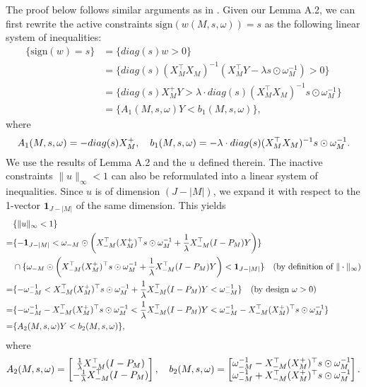 \documentclass[11pt]{article}
\newcommand{\q}{\text{\quad}}
\newcommand{\sgn}{\textrm{sign}}
\begin{document}
	The proof below follows similar arguments as in \cite{tian2018selective}. Given our Lemma A.2, we can first rewrite the active constraints $\sgn(w(M,s,\omega))=s$ as the following linear system of inequalities:
	\begin{equation}\label{22}
		\begin{split}
			\{\sgn(w)=s\}
			&=\{diag(s)w>0 \}\\
			&=\{diag(s)(X_M^\top X_M)^{-1}(X_M^\top Y-\lambda s\odot\omega^{-1}_M)>0 \}\\
			&=\{diag(s)X_M^+Y>\lambda \cdot diag(s)(X_M^\top X_M)^{-1}s\odot\omega^{-1}_M\}\\
			&=\{A_1(M,s,\omega)Y<b_1(M,s,\omega)\},
		\end{split}
	\end{equation}
	where
	\begin{equation}
		A_1(M,s,\omega)=-diag(s)X_M^+,\q b_1(M,s,\omega)=-\lambda \cdot diag(s)(X_M^\top X_M)^{-1}s\odot\omega^{-1}_M.
	\end{equation}
	We use the results of Lemma A.2 and the $u$ defined therein. The inactive constraints $\|u\|_\infty<1 $ can also be reformulated into a linear system of inequalities. Since $u$ is of dimension $(J-|M|)$, we expand it with respect to the 1-vector $\bm{1}_{J-|M|}$ of the same dimension. This yields
	\begin{equation}\label{23}
		\begin{split}
			&\{\|u\|_\infty<1 \}\\
			=&\{-\bm{1}_{J-|M|}<\omega_{-M}\odot
			\bigg(
			X_{-M}^\top(X_M^+)^\top s\odot\omega^{-1}_M
			+\frac{1}{\lambda}X_{-M}^\top (I-P_M)Y\bigg)\}\\
			&\cap\{\omega_{-M}\odot
			\bigg(
			X_{-M}^\top(X_M^+)^\top s\odot\omega^{-1}_M
			+\frac{1}{\lambda}X_{-M}^\top (I-P_M)Y\bigg)<\bm{1}_{J-|M|}\}\q\text{(by definition of $\|\cdot\|_\infty$)}\\
			=&\{-\omega_{-M}^{-1}<
			X_{-M}^\top(X_M^+)^\top s\odot\omega^{-1}_M
			+\frac{1}{\lambda}X_{-M}^\top (I-P_M)Y<\omega_{-M}^{-1}\}\q\text{(by design $\omega>0$)}\\
			=&\{-\omega_{-M}^{-1}-X_{-M}^\top(X_M^+)^\top s\odot\omega^{-1}_M<
			\frac{1}{\lambda}X_{-M}^\top (I-P_M)Y<\omega_{-M}^{-1}-X_{-M}^\top(X_M^+)^\top s\odot\omega^{-1}_M\}\\
			=&\{A_2(M,s,\omega)Y<b_2(M,s,\omega)\},
		\end{split}
	\end{equation}
	where
	\begin{equation}\label{29}
		A_2(M,s,\omega)=\begin{bmatrix}
			\frac{1}{\lambda}X_{-M}^\top (I-P_M)\\
			-\frac{1}{\lambda}X_{-M}^\top (I-P_M)
		\end{bmatrix},\q
		b_2(M,s,\omega)=\begin{bmatrix}
			\omega_{-M}^{-1}-X_{-M}^\top(X_M^+)^\top s\odot\omega^{-1}_M\\
			\omega_{-M}^{-1}+X_{-M}^\top(X_M^+)^\top s\odot\omega^{-1}_M
		\end{bmatrix}.
	\end{equation}
\end{document}
